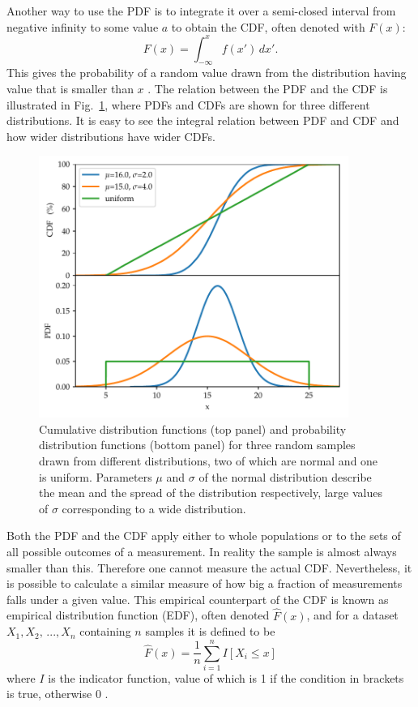 \documentclass[english, twoside]{HYgradu}
\begin{document}
Another way to use the PDF is to integrate it over a semi-closed interval from negative infinity to some value $a$ to obtain the CDF, often denoted with $F(x)$:
\begin{equation}
	F(x) = \int_{-\infty}^x f(x') \,dx'.
\end{equation}	
This gives the probability of a random value drawn from the distribution having value that is smaller than $x$ \citep{htk}. The relation between the PDF and the CDF is illustrated in Fig.\ \ref{fig:cdf}, where PDFs and CDFs are shown for three different distributions. It is easy to see the integral relation between PDF and CDF and how wider distributions have wider CDFs.

\begin{figure}
   \centering
   \includegraphics[width=0.9\textwidth]{kuvat/cdf.pdf}
   \caption{Cumulative distribution functions (top panel) and probability distribution functions (bottom panel) for three random samples drawn from different distributions, two of which are normal and one is uniform. Parameters $\mu$ and $\sigma$ of the normal distribution describe the mean and the spread of the distribution respectively, large values of $\sigma$ corresponding to a wide distribution.}
   \label{fig:cdf}

\end{figure}

Both the PDF and the CDF apply either to whole populations or to the sets of all possible outcomes of a measurement. In reality the sample is almost always smaller than this. Therefore one cannot measure the actual CDF. Nevertheless, it is possible to calculate a similar measure of how big a fraction of measurements falls under a given value. This empirical counterpart of the CDF is known as empirical distribution function (EDF), often denoted $\hat F(x)$, and for a dataset $X_1, X_2,\,..., X_n$ containing $n$ samples it is defined to be
\begin{equation}
	\hat F(x) = \frac{1}{n}\sum_{i=1}^n I[X_i \leq x]
\end{equation}
where $I$ is the indicator function, value of which is 1 if the condition in brackets is true, otherwise 0 \citep{feigelson2012modern}.
\end{document}
